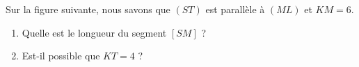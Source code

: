 
\begin{exercice}\label{exo2smath-0089}

    Sur la figure suivante, nous savons que $ (ST)$ est parallèle à \( (ML)\) et \( KM=6\).

\begin{center}

\end{center}
\begin{enumerate}
    \item
        Quelle est le longueur du segment \( [SM]\) ?
    \item
        Est-il possible que \( KT=4\) ?
\end{enumerate}

\end{exercice}
